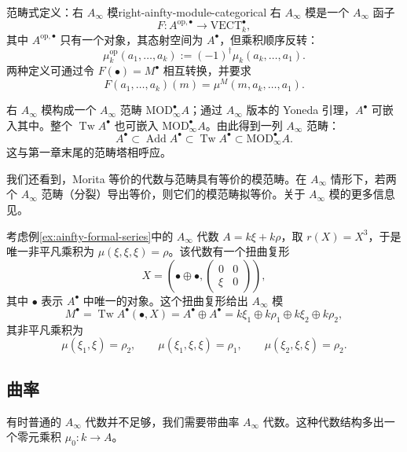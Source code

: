 \begin{definition}{范畴式定义：右 $A_\infty$ 模}{right-ainfty-module-categorical}
右 $A_\infty$ 模是一个 $A_\infty$ 函子
\[
  F\colon A^{\mathrm{op},\bullet}\longrightarrow\mathrm{VECT}_k^\bullet,
\]
其中 $A^{\mathrm{op},\bullet}$ 只有一个对象，其态射空间为 $A^\bullet$，但乘积顺序反转：
\[
  \mu_k^{\mathrm{op}}(a_1,\ldots,a_k)
  :=(-1)^\dagger\mu_k(a_k,\ldots,a_1).
\]
两种定义可通过令 $F(\bullet)=M^\bullet$ 相互转换，并要求
\[
  F(a_1,\ldots,a_k)(m)=\mu^M(m,a_k,\ldots,a_1).
\]
\end{definition}

右 $A_\infty$ 模构成一个 $A_\infty$ 范畴 $\mathrm{MOD}^\bullet_\infty A$；通过 $A_\infty$ 版本的 Yoneda 引理，$A^\bullet$ 可嵌入其中。整个 $\operatorname{Tw}A^\bullet$ 也可嵌入 $\mathrm{MOD}^\bullet_\infty A$。由此得到一列 $A_\infty$ 范畴：
\[
  A^\bullet\subset\operatorname{Add}A^\bullet
  \subset\operatorname{Tw}A^\bullet\subset\mathrm{MOD}^\bullet_\infty A.
\]
这与第一章末尾的范畴塔相呼应。

我们还看到，Morita 等价的代数与范畴具有等价的模范畴。在 $A_\infty$ 情形下，若两个 $A_\infty$ 范畴（分裂）导出等价，则它们的模范畴拟等价。关于 $A_\infty$ 模的更多信息见。

\begin{example}\label{ex:twisted-complex-ainfty-module}
考虑例\ref{ex:ainfty-formal-series}中的 $A_\infty$ 代数 $A=k\xi+k\rho$，取 $r(X)=X^3$，于是唯一非平凡乘积为 $\mu(\xi,\xi,\xi)=\rho$。该代数有一个扭曲复形
\[
  X=\left(\bullet\oplus\bullet,
  \begin{pmatrix}0&0\\ \xi&0\end{pmatrix}\right),
\]
其中 $\bullet$ 表示 $A^\bullet$ 中唯一的对象。这个扭曲复形给出 $A_\infty$ 模
\[
  M^\bullet=\operatorname{Tw}A^\bullet(\bullet,X)
  =A^\bullet\oplus A^\bullet
  =k\xi_1\oplus k\rho_1\oplus k\xi_2\oplus k\rho_2,
\]
其非平凡乘积为
\[
  \mu(\xi_1,\xi)=\rho_2,\qquad
  \mu(\xi_1,\xi,\xi)=\rho_1,\qquad
  \mu(\xi_2,\xi,\xi)=\rho_2.
\]
\end{example}

\subsection{曲率}\label{subsec:curvature}
有时普通的 $A_\infty$ 代数并不足够，我们需要带曲率 $A_\infty$ 代数。这种代数结构多出一个零元乘积 $\mu_0\colon k\to A$。

